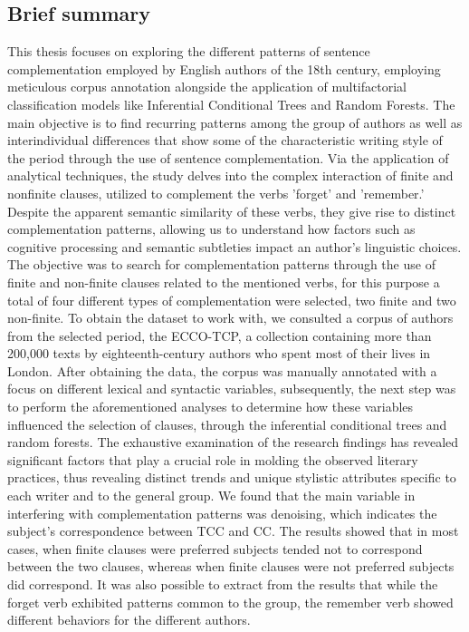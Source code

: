 \documentclass[final]{clv3} %
\begin{document}
\subsection{Brief summary}
This thesis focuses on exploring the different patterns of sentence complementation employed by English authors of the 18th century, employing meticulous corpus annotation alongside the application of multifactorial classification models like Inferential Conditional Trees and Random Forests. The main objective is to find recurring patterns among the group of authors as well as interindividual differences that show some of the characteristic writing style of the period through the use of sentence complementation. Via the application of analytical techniques, the study delves into the complex interaction of finite and nonfinite clauses, utilized to complement the verbs 'forget' and 'remember.' Despite the apparent semantic similarity of these verbs, they give rise to distinct complementation patterns, allowing us to understand how factors such as cognitive processing and semantic subtleties impact an author’s linguistic choices. The objective was to search for complementation patterns through the use of finite and non-finite clauses related to the mentioned verbs, for this purpose a total of four different types of complementation were selected, two finite and two non-finite. To obtain the dataset to work with, we consulted a corpus of authors from the selected period, the ECCO-TCP, a collection containing more than 200,000 texts by eighteenth-century authors who spent most of their lives in London. After obtaining the data, the corpus was manually annotated with a focus on different lexical and syntactic variables, subsequently, the next step was to perform the aforementioned analyses to determine how these variables influenced the selection of clauses, through the inferential conditional trees and random forests. 
The exhaustive examination of the research findings has revealed significant factors that play a crucial role in molding the observed literary practices, thus revealing distinct trends and unique stylistic attributes specific to each writer and to the general group. We found that the main variable in interfering with complementation patterns was denoising, which indicates the subject's correspondence between TCC and CC. The results showed that in most cases, when finite clauses were preferred subjects tended not to correspond between the two clauses, whereas when finite clauses were not preferred subjects did correspond. It was also possible to extract from the results that while the forget verb exhibited patterns common to the group, the remember verb showed different behaviors for the different authors.
\end{document}
